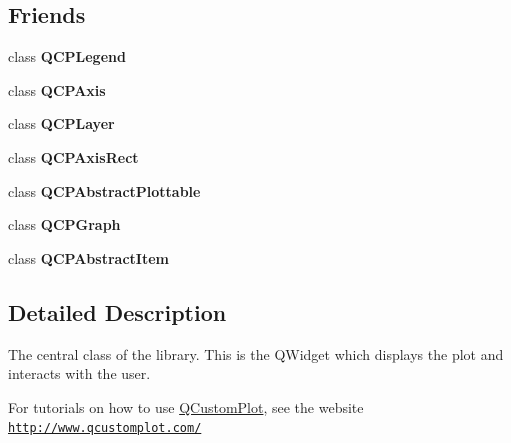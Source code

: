 \subsection*{Friends}
\begin{DoxyCompactItemize}
\item 
class {\bfseries Q\+C\+P\+Legend}\hypertarget{classQCustomPlot_a8429035e7adfbd7f05805a6530ad5e3b}{}\label{classQCustomPlot_a8429035e7adfbd7f05805a6530ad5e3b}

\item 
class {\bfseries Q\+C\+P\+Axis}\hypertarget{classQCustomPlot_af123edeca169ec7a31958a1d714e1a8a}{}\label{classQCustomPlot_af123edeca169ec7a31958a1d714e1a8a}

\item 
class {\bfseries Q\+C\+P\+Layer}\hypertarget{classQCustomPlot_a5dbf96bf7664c1b6fce49063eeea6eef}{}\label{classQCustomPlot_a5dbf96bf7664c1b6fce49063eeea6eef}

\item 
class {\bfseries Q\+C\+P\+Axis\+Rect}\hypertarget{classQCustomPlot_acbf20ecb140f66c5fd1bc64ae0762990}{}\label{classQCustomPlot_acbf20ecb140f66c5fd1bc64ae0762990}

\item 
class {\bfseries Q\+C\+P\+Abstract\+Plottable}\hypertarget{classQCustomPlot_a53cf0e76aca814550c796fed79e345d6}{}\label{classQCustomPlot_a53cf0e76aca814550c796fed79e345d6}

\item 
class {\bfseries Q\+C\+P\+Graph}\hypertarget{classQCustomPlot_ad0c52e327d94c699d415fd61f930700a}{}\label{classQCustomPlot_ad0c52e327d94c699d415fd61f930700a}

\item 
class {\bfseries Q\+C\+P\+Abstract\+Item}\hypertarget{classQCustomPlot_a93e962f2e677e31ecc575bb884e46adf}{}\label{classQCustomPlot_a93e962f2e677e31ecc575bb884e46adf}

\end{DoxyCompactItemize}


\subsection{Detailed Description}
The central class of the library. This is the Q\+Widget which displays the plot and interacts with the user. 

For tutorials on how to use \hyperlink{classQCustomPlot}{Q\+Custom\+Plot}, see the website~\newline
\href{http://www.qcustomplot.com/}{\tt http\+://www.\+qcustomplot.\+com/} 


